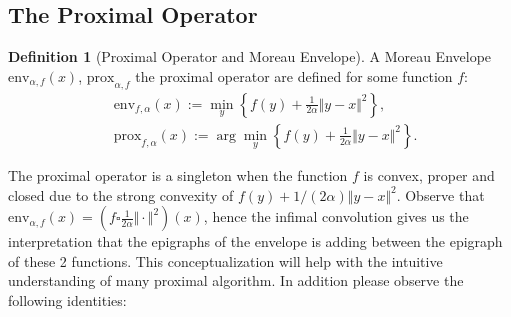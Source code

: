 \documentclass[]{article}
\theoremstyle{definition}
\newtheorem{definition}{Definition}
\begin{document}
    \subsection{The Proximal Operator}
        \begin{definition}[Proximal Operator and Moreau Envelope]
            A Moreau Envelope $\text{env}_{\alpha, f}(x)$, $\text{prox}_{\alpha, f}$ the proximal operator are defined for some function $f$: 
            $$
            \begin{aligned}
                & \text{env}_{f, \alpha}(x) := \min_{y}\left\lbrace
                    f(y) + \frac{1}{2 \alpha }\Vert y - x\Vert^2
                \right\rbrace, 
                \\
                & \text{prox}_{f, \alpha}(x) := 
                \arg\min_{y}\left\lbrace
                    f(y) + \frac{1}{2\alpha} \Vert y - x\Vert^2
                \right\rbrace. 
            \end{aligned}
            $$
        \end{definition}
        
        The proximal operator is a singleton when the function $f$ is convex, proper and closed due to the strong convexity of $f(y) + 1/(2\alpha)\Vert y - x\Vert^2$. Observe that $\text{env}_{\alpha, f}(x) = (f\square \frac{1}{2\alpha}\Vert \cdot \Vert^2)(x)$, hence the infimal convolution gives us the interpretation that the epigraphs of the envelope is adding between the epigraph of these 2 functions. This conceptualization will help with the intuitive understanding of many proximal algorithm. 
        In addition please observe the following identities: 
\end{document}
